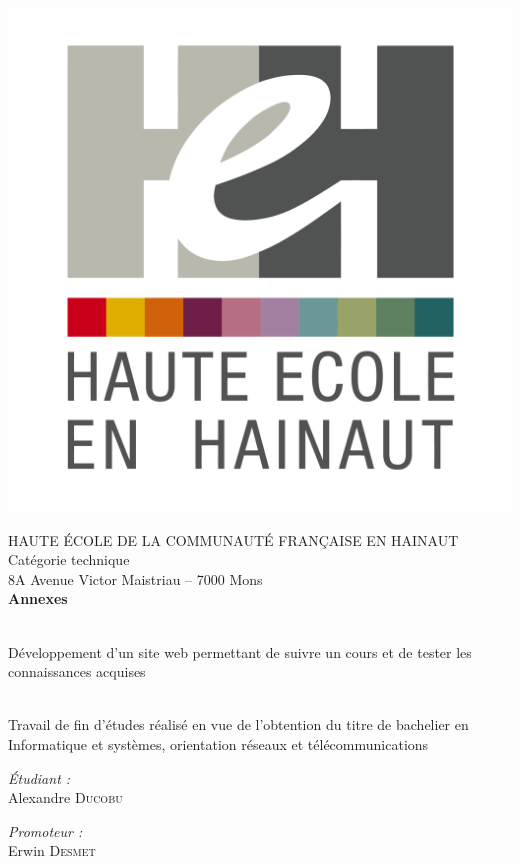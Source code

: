 \begin{center}
  \includegraphics[scale=0.12]{textures/logo/heh.pdf}

  \vspace{0.5cm}

  HAUTE ÉCOLE DE LA COMMUNAUTÉ FRANÇAISE EN HAINAUT \\
  Catégorie technique \\
  8A Avenue Victor Maistriau – 7000 Mons \\ [0.5cm]
  
  {\Huge \textbf{Annexes}}

  \begingroup
   \selectfont 

  \HRule \\ [0.4cm] {
    \huge Développement d'un site web permettant de suivre un cours et de tester les connaissances acquises \\ [0.2cm] 
  }
  \HRule \\ [0.3cm]
  \endgroup
  
  Travail de fin d'études réalisé en vue de l'obtention du titre de bachelier en Informatique et systèmes, orientation réseaux et télécommunications \\ [1cm]
  
  \begin{minipage}[t]{0.4 \textwidth} 
    \begin{flushleft} 
      \large \emph{Étudiant :} \\ 
      Alexandre \textsc{Ducobu}
    \end{flushleft} 
  \end{minipage}
  \begin{minipage}[t]{0.4 \textwidth}
    \begin{flushright} 
      \large \emph{Promoteur :} \\ 
      Erwin \textsc{Desmet}
    \end{flushright} 
  \end{minipage}


\end{center}
